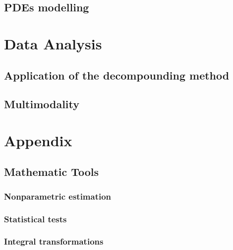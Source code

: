 \documentclass[mainlanguage=french,fncychap=none, secnumdepth=paragraph]{yathesis}
\begin{document}
\chapter{PDEs modelling}
    

\part{Data Analysis}
\chapter{Application of the decompounding method}
\chapter{Multimodality}
    

\appendix
\part{Appendix}
\chapter{Mathematic Tools}
\section{Nonparametric estimation}
\section{Statistical tests}
\section{Integral transformations}

\backmatter

\printbibliography

\makebackcover
\end{document}
